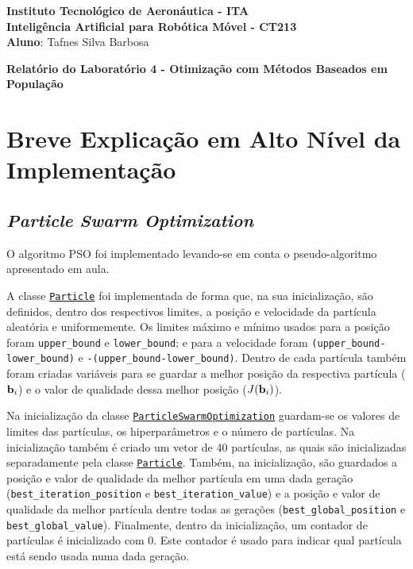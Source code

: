 \documentclass[brazil, 12pt]{article}
\begin{document}
\begin{center}
\textbf{Instituto Tecnológico de Aeronáutica - ITA} \\
\textbf{Inteligência Artificial para Robótica Móvel - CT213} \\
\textbf{Aluno}: Tafnes Silva Barbosa    %
\end{center}

\begin{center}
\textbf{Relatório do Laboratório 4 - Otimização com Métodos Baseados em População}
\end{center}
\vspace*{0.5cm}

\section{Breve Explicação em Alto Nível da Implementação}

\subsection{\emph{Particle Swarm Optimization}}
O algoritmo PSO foi implementado levando-se em conta o pseudo-algoritmo apresentado em aula.

A classe \texttt{\underline{Particle}} foi implementada de forma que, na sua inicialização, são definidos, dentro dos respectivos limites, a posição e velocidade da partícula aleatória e uniformemente. Os limites máximo e mínimo usados para a posição foram \texttt{upper\_bound} e \texttt{lower\_bound}; e para a velocidade foram \texttt{(upper\_bound-lower\_bound)} e \texttt{-(upper\_bound-lower\_bound)}. Dentro de cada partícula também foram criadas variáveis para se guardar a melhor posição da respectiva partícula ($\text{\textbf{b}}_{i}$) e o valor de qualidade dessa melhor posição ($J(\text{\textbf{b}}_{i})$).

Na inicialização da classe \texttt{\underline{ParticleSwarmOptimization}} guardam-se os valores de limites das partículas, os hiperparâmetros e o número de partículas. Na inicialização também é criado um vetor de 40 partículas, as quais são inicializadas separadamente pela classe \texttt{\underline{Particle}}. Também, na inicialização, são guardados a posição e valor de qualidade da melhor partícula em uma dada geração (\texttt{best\_iteration\_position} e \texttt{best\_iteration\_value}) e a posição e valor de qualidade da melhor partícula dentre todas as gerações (\texttt{best\_global\_position} e \texttt{best\_global\_value}). Finalmente, dentro da inicialização, um contador de partículas é inicializado com 0. Este contador é usado para indicar qual partícula está sendo usada numa dada geração.
\end{document}

